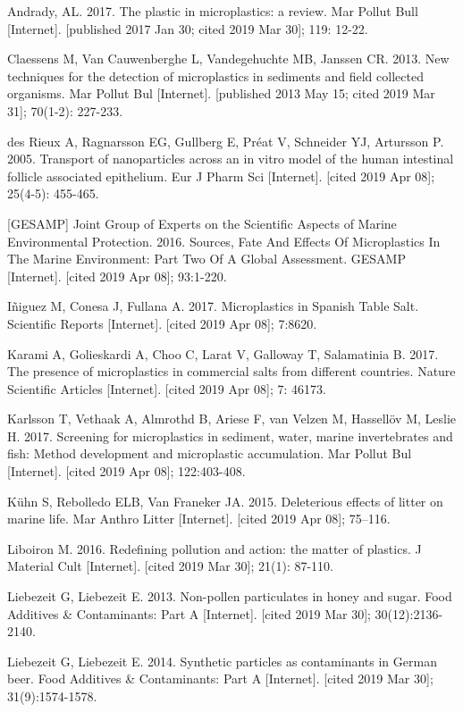 \documentclass[]{article}
\begin{document}
Andrady, AL. 2017. The plastic in microplastics: a review. Mar Pollut
Bull {[}Internet{]}. {[}published 2017 Jan 30; cited 2019 Mar 30{]};
119: 12-22.

Claessens M, Van Cauwenberghe L, Vandegehuchte MB, Janssen CR. 2013. New
techniques for the detection of microplastics in sediments and field
collected organisms. Mar Pollut Bul {[}Internet{]}. {[}published 2013
May 15; cited 2019 Mar 31{]}; 70(1-2): 227-233.

des Rieux A, Ragnarsson EG, Gullberg E, Préat V, Schneider YJ, Artursson
P. 2005. Transport of nanoparticles across an in vitro model of the
human intestinal follicle associated epithelium. Eur J Pharm Sci
{[}Internet{]}. {[}cited 2019 Apr 08{]}; 25(4-5): 455-465.

{[}GESAMP{]} Joint Group of Experts on the Scientific Aspects of Marine
Environmental Protection. 2016. Sources, Fate And Effects Of
Microplastics In The Marine Environment: Part Two Of A Global
Assessment. GESAMP {[}Internet{]}. {[}cited 2019 Apr 08{]}; 93:1-220.

Iñiguez M, Conesa J, Fullana A. 2017. Microplastics in Spanish Table
Salt. Scientific Reports {[}Internet{]}. {[}cited 2019 Apr 08{]};
7:8620.

Karami A, Golieskardi A, Choo C, Larat V, Galloway T, Salamatinia B.
2017. The presence of microplastics in commercial salts from different
countries. Nature Scientific Articles {[}Internet{]}. {[}cited 2019 Apr
08{]}; 7: 46173.

Karlsson T, Vethaak A, Almrothd B, Ariese F, van Velzen M, Hassellöv M,
Leslie H. 2017. Screening for microplastics in sediment, water, marine
invertebrates and fish: Method development and microplastic
accumulation. Mar Pollut Bul {[}Internet{]}. {[}cited 2019 Apr 08{]};
122:403-408.

Kühn S, Rebolledo ELB, Van Franeker JA. 2015. Deleterious effects of
litter on marine life. Mar Anthro Litter {[}Internet{]}. {[}cited 2019
Apr 08{]}; 75--116.

Liboiron M. 2016. Redefining pollution and action: the matter of
plastics. J Material Cult {[}Internet{]}. {[}cited 2019 Mar 30{]};
21(1): 87-110.

Liebezeit G, Liebezeit E. 2013. Non-pollen particulates in honey and
sugar. Food Additives \& Contaminants: Part A {[}Internet{]}. {[}cited
2019 Mar 30{]}; 30(12):2136-2140.

Liebezeit G, Liebezeit E. 2014. Synthetic particles as contaminants in
German beer. Food Additives \& Contaminants: Part A {[}Internet{]}.
{[}cited 2019 Mar 30{]}; 31(9):1574-1578.
\end{document}
